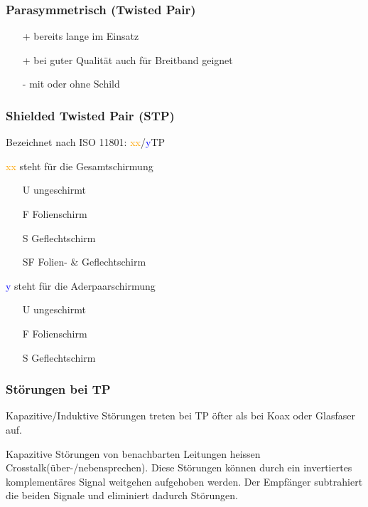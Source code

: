 \subsubsection{Parasymmetrisch (Twisted Pair)}
\begin{itemize}
    \item[+] bereits lange im Einsatz
    \item[+] bei guter Qualität auch für Breitband geignet
    \item[-] mit oder ohne Schild
\end{itemize}

\subsubsection{Shielded Twisted Pair (STP)}

Bezeichnet nach ISO 11801: \textcolor{orange}{xx}/\textcolor{blue}{y}TP

\begin{multicols}{2}
    \textcolor{orange}{xx} steht für die Gesamtschirmung
    \begin{itemize}
        \item[U] ungeschirmt
        \item[F] Folienschirm
        \item[S] Geflechtschirm
        \item[SF] Folien- \& Geflechtschirm
    \end{itemize}

    \columnbreak

    \textcolor{blue}{y} steht für die Aderpaarschirmung
    \begin{itemize}
        \item[U] ungeschirmt
        \item[F] Folienschirm
        \item[S] Geflechtschirm
		\item[\vspace{\fill}]
    \end{itemize}
\end{multicols}


\subsubsection{Störungen bei TP}

Kapazitive/Induktive Störungen treten bei TP öfter als bei Koax oder Glasfaser auf.

Kapazitive Störungen von benachbarten Leitungen heissen Crosstalk(über-/nebensprechen).
Diese Störungen können durch ein invertiertes komplementäres Signal weitgehen aufgehoben werden.
Der Empfänger subtrahiert die beiden Signale und eliminiert dadurch Störungen.


